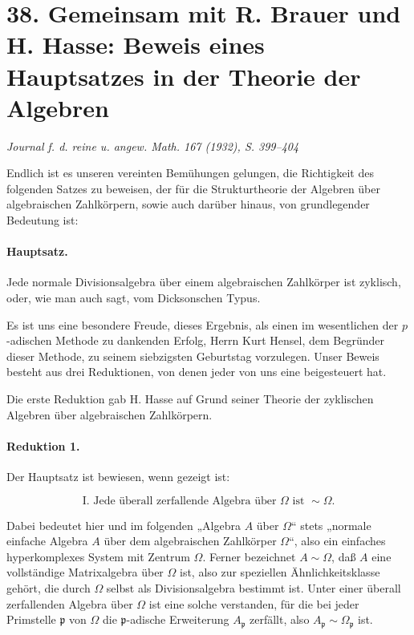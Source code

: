 \documentclass[11pt]{article}
\providecommand{\Om}{\Omega}
\begin{document}
\clearpage

\section*{38. Gemeinsam mit R. Brauer und H. Hasse: Beweis eines Hauptsatzes in der Theorie der Algebren}

\begin{center}
\emph{Journal f. d. reine u. angew. Math. 167 (1932), S. 399--404}
\end{center}

Endlich ist es unseren vereinten Bemühungen gelungen, die Richtigkeit des folgenden Satzes zu beweisen, der für die Strukturtheorie der Algebren über algebraischen Zahlkörpern, sowie auch darüber hinaus, von grundlegender Bedeutung ist:

\paragraph{Hauptsatz.}
Jede normale Divisionsalgebra über einem algebraischen Zahlkörper ist zyklisch, oder, wie man auch sagt, vom Dicksonschen Typus.

Es ist uns eine besondere Freude, dieses Ergebnis, als einen im wesentlichen der \(p\)-adischen Methode zu dankenden Erfolg, Herrn Kurt Hensel, dem Begründer dieser Methode, zu seinem siebzigsten Geburtstag vorzulegen. Unser Beweis besteht aus drei Reduktionen, von denen jeder von uns eine beigesteuert hat.

Die erste Reduktion gab H. Hasse auf Grund seiner Theorie der zyklischen Algebren über algebraischen Zahlkörpern.

\paragraph{Reduktion 1.}
Der Hauptsatz ist bewiesen, wenn gezeigt ist:

\[
\text{I. Jede überall zerfallende Algebra über }\Om\text{ ist } \sim\Om .
\]

Dabei bedeutet hier und im folgenden „Algebra \(A\) über \(\Om\)“ stets „normale einfache Algebra \(A\) über dem algebraischen Zahlkörper \(\Om\)“, also ein einfaches hyperkomplexes System mit Zentrum \(\Om\). Ferner bezeichnet \(A\sim\Om\), daß \(A\) eine vollständige Matrixalgebra über \(\Om\) ist, also zur speziellen Ähnlichkeitsklasse gehört, die durch \(\Om\) selbst als Divisionsalgebra bestimmt ist. Unter einer überall zerfallenden Algebra über \(\Om\) ist eine solche verstanden, für die bei jeder Primstelle \(\mathfrak p\) von \(\Om\) die \(\mathfrak p\)-adische Erweiterung \(A_{\mathfrak p}\) zerfällt, also \(A_{\mathfrak p}\sim \Om_{\mathfrak p}\) ist.
\end{document}
